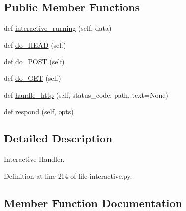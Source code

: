 \subsection*{Public Member Functions}
\begin{DoxyCompactItemize}
\item 
def \hyperlink{classprojects_1_1image__chat_1_1interactive_1_1MyHandler_a6db12cd5204d5f4469f8570c7c38d007}{interactive\+\_\+running} (self, data)
\item 
def \hyperlink{classprojects_1_1image__chat_1_1interactive_1_1MyHandler_a40845d6fbb9eed68138c9ae1c52d1344}{do\+\_\+\+H\+E\+AD} (self)
\item 
def \hyperlink{classprojects_1_1image__chat_1_1interactive_1_1MyHandler_a7dcb1ea02322e970240bd16b605096fd}{do\+\_\+\+P\+O\+ST} (self)
\item 
def \hyperlink{classprojects_1_1image__chat_1_1interactive_1_1MyHandler_adfa43f376385fc93432e34306cc93308}{do\+\_\+\+G\+ET} (self)
\item 
def \hyperlink{classprojects_1_1image__chat_1_1interactive_1_1MyHandler_af277e2d0f6c00fc1d0d3467c577a20f8}{handle\+\_\+http} (self, status\+\_\+code, path, text=None)
\item 
def \hyperlink{classprojects_1_1image__chat_1_1interactive_1_1MyHandler_a8c651ac02abcedfd49fd7b89128ee737}{respond} (self, opts)
\end{DoxyCompactItemize}


\subsection{Detailed Description}
\begin{DoxyVerb}Interactive Handler.
\end{DoxyVerb}
 

Definition at line 214 of file interactive.\+py.



\subsection{Member Function Documentation}
\mbox{\label{classprojects_1_1image__chat_1_1interactive_1_1MyHandler_adfa43f376385fc93432e34306cc93308}} 
